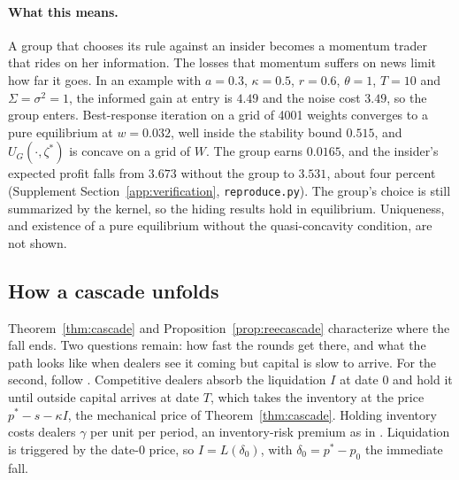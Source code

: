 \documentclass[12pt]{article}
\theoremstyle{definition}
\theoremstyle{remark}
\begin{document}
\paragraph{What this means.} A group that chooses its rule against an insider becomes a momentum trader that rides on her information. The losses that momentum suffers on news limit how far it goes. In an example with $a=0.3$, $\kappa=0.5$, $r=0.6$, $\theta=1$, $T=10$ and $\Sigma=\sigma^2=1$, the informed gain at entry is $4.49$ and the noise cost $3.49$, so the group enters. Best-response iteration on a grid of 4001 weights converges to a pure equilibrium at $w=0.032$, well inside the stability bound $0.515$, and $U_G(\cdot,\zeta^*)$ is concave on a grid of $W$. The group earns $0.0165$, and the insider's expected profit falls from $3.673$ without the group to $3.531$, about four percent (Supplement Section~\ref{app:verification}, \nolinkurl{reproduce.py}). The group's choice is still summarized by the kernel, so the hiding results hold in equilibrium. Uniqueness, and existence of a pure equilibrium without the quasi-concavity condition, are not shown.

\subsection{How a cascade unfolds}

Theorem~\ref{thm:cascade} and Proposition~\ref{prop:reecascade} characterize where the fall ends. Two questions remain: how fast the rounds get there, and what the path looks like when dealers see it coming but capital is slow to arrive. For the second, follow \citet{duffie2010}. Competitive dealers absorb the liquidation $I$ at date $0$ and hold it until outside capital arrives at date $T$, which takes the inventory at the price $p^*-s-\kappa I$, the mechanical price of Theorem~\ref{thm:cascade}. Holding inventory costs dealers $\gamma$ per unit per period, an inventory-risk premium as in \citet{grossman1988}. Liquidation is triggered by the date-$0$ price, so $I=L(\delta_0)$, with $\delta_0=p^*-p_0$ the immediate fall.
\end{document}
